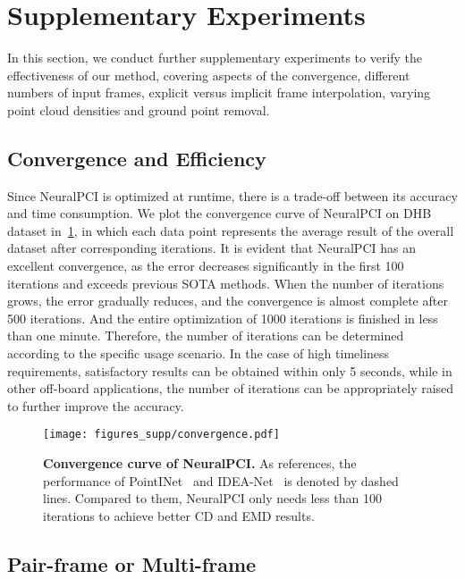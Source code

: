 \documentclass[10pt,twocolumn,letterpaper]{article}
\begin{document}
\section{Supplementary Experiments}
\label{sec:appendix experiments}

In this section, we conduct further supplementary experiments to verify the effectiveness of our method, covering aspects of the convergence, different numbers of input frames, explicit versus implicit frame interpolation, varying point cloud densities and ground point removal.




\subsection{Convergence and Efficiency}

Since NeuralPCI is optimized at runtime, there is a trade-off between its accuracy and time consumption. We plot the convergence curve of NeuralPCI on DHB dataset in~\cref{fig:convergence}, in which each data point represents the average result of the overall dataset after corresponding iterations. It is evident that NeuralPCI has an excellent convergence, as the error decreases significantly in the first 100 iterations and exceeds previous SOTA methods. When the number of iterations grows, the error gradually reduces, and the convergence is almost complete after 500 iterations. And the entire optimization of 1000 iterations is finished in less than one minute. Therefore, the number of iterations can be determined according to the specific usage scenario. In the case of high timeliness requirements, satisfactory results can be obtained within only 5 seconds, while in other off-board applications, the number of iterations can be appropriately raised to further improve the accuracy. 


\begin{figure}[t]
\centering
  \texttt{[image: figures\_supp/convergence.pdf]}
  \caption{\textbf{Convergence curve of NeuralPCI.} As references, the performance of PointINet~\cite{lu2021pointinet} and IDEA-Net~\cite{zeng2022idea} is denoted by dashed lines. Compared to them, NeuralPCI only needs less than 100 iterations to achieve better CD and EMD results.}
  \label{fig:convergence}
\vspace{-.2cm}
\end{figure} 


\subsection{Pair-frame or Multi-frame}
\end{document}
